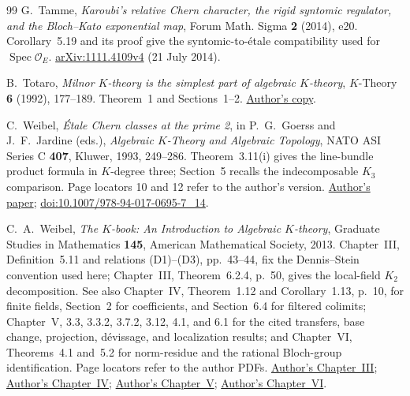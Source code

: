 \documentclass[11pt,a4paper]{amsart}
\numberwithin{equation}{section}
\theoremstyle{definition}
\theoremstyle{remark}
\newcommand{\OO}{\mathcal O}
\newcommand{\Spec}{\operatorname{Spec}}
\begin{document}
\begin{thebibliography}{99}
G.~Tamme, \emph{Karoubi's relative Chern character, the rigid syntomic regulator, and the Bloch--Kato exponential map},
Forum Math. Sigma \textbf{2} (2014), e20.
Corollary~5.19 and its proof give the syntomic-to-\'etale compatibility used for $\Spec\OO_E$.
\href{https://arxiv.org/abs/1111.4109v4}{arXiv:1111.4109v4}
(21 July 2014).

B.~Totaro, \emph{Milnor $K$-theory is the simplest part of algebraic
$K$-theory}, $K$-Theory \textbf{6} (1992), 177--189.
Theorem~1 and Sections~1--2.
\href{https://www.math.ucla.edu/~totaro/papers/public_html/milnor.pdf}
{Author's copy}.

C.~Weibel, \emph{\'Etale Chern classes at the prime 2},
in P.~G.~Goerss and J.~F.~Jardine (eds.),
\emph{Algebraic $K$-Theory and Algebraic Topology},
NATO ASI Series C \textbf{407}, Kluwer, 1993, 249--286.
Theorem~3.11(i) gives the line-bundle product formula in $K$-degree three;
Section~5 recalls the indecomposable $K_3$ comparison.
Page locators 10 and 12 refer to the author's version.
\href{https://sites.math.rutgers.edu/~weibel/archive/papers-dir/chernclass.pdf}{Author's paper};
\href{https://doi.org/10.1007/978-94-017-0695-7_14}{doi:10.1007/978-94-017-0695-7\_14}.

C.~A.~Weibel, \emph{The $K$-book: An Introduction to Algebraic $K$-theory}, Graduate Studies in Mathematics \textbf{145}, American Mathematical Society, 2013.
Chapter~III, Definition~5.11 and relations (D1)--(D3), pp.~43--44,
fix the Dennis--Stein convention used here; Chapter~III,
Theorem~6.2.4, p.~50, gives the local-field $K_2$ decomposition.
See also Chapter~IV, Theorem~1.12 and Corollary~1.13, p.~10,
for finite fields, Section~2 for coefficients, and Section~6.4
for filtered colimits; Chapter~V, 3.3, 3.3.2, 3.7.2, 3.12,
4.1, and 6.1 for the cited transfers, base change, projection,
d\'evissage, and localization results; and Chapter~VI,
Theorems~4.1 and~5.2 for norm-residue and the rational
Bloch-group identification. Page locators refer to the author PDFs.
\href{https://sites.math.rutgers.edu/~weibel/Kbook/Kbook.III.pdf}{Author's Chapter~III};
\href{https://sites.math.rutgers.edu/~weibel/Kbook/Kbook.IV.pdf}{Author's Chapter~IV};
\href{https://sites.math.rutgers.edu/~weibel/Kbook/Kbook.V.pdf}{Author's Chapter~V};
\href{https://sites.math.rutgers.edu/~weibel/Kbook/Kbook.VI.pdf}{Author's Chapter~VI}.
\end{thebibliography}

\end{document}
